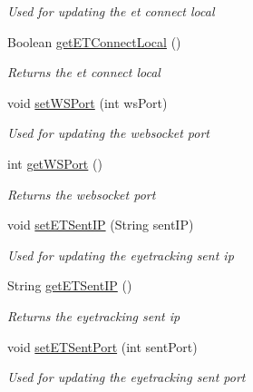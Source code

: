 \begin{DoxyCompactItemize}
\begin{DoxyCompactList}\small\item\em Used for updating the et connect local \end{DoxyCompactList}\item 
Boolean \hyperlink{class_web_analyzer_1_1_u_i_1_1_interaction_objects_1_1_application_settings_obj_a42c4eab832591c0046d0d9709742d79d}{get\+E\+T\+Connect\+Local} ()
\begin{DoxyCompactList}\small\item\em Returns the et connect local \end{DoxyCompactList}\item 
void \hyperlink{class_web_analyzer_1_1_u_i_1_1_interaction_objects_1_1_application_settings_obj_a5da6f244c6f2a35fa197070eecf8cd29}{set\+W\+S\+Port} (int ws\+Port)
\begin{DoxyCompactList}\small\item\em Used for updating the websocket port \end{DoxyCompactList}\item 
int \hyperlink{class_web_analyzer_1_1_u_i_1_1_interaction_objects_1_1_application_settings_obj_a2a7a4913d53f8a212ac7ddcaaa28e9ad}{get\+W\+S\+Port} ()
\begin{DoxyCompactList}\small\item\em Returns the websocket port \end{DoxyCompactList}\item 
void \hyperlink{class_web_analyzer_1_1_u_i_1_1_interaction_objects_1_1_application_settings_obj_a57791b867b39f8081b0db8bfc151269b}{set\+E\+T\+Sent\+I\+P} (String sent\+I\+P)
\begin{DoxyCompactList}\small\item\em Used for updating the eyetracking sent ip \end{DoxyCompactList}\item 
String \hyperlink{class_web_analyzer_1_1_u_i_1_1_interaction_objects_1_1_application_settings_obj_a9068e7afcd99a469070610a473e92937}{get\+E\+T\+Sent\+I\+P} ()
\begin{DoxyCompactList}\small\item\em Returns the eyetracking sent ip \end{DoxyCompactList}\item 
void \hyperlink{class_web_analyzer_1_1_u_i_1_1_interaction_objects_1_1_application_settings_obj_a095d468164bf3a15afb20263d5c4acc9}{set\+E\+T\+Sent\+Port} (int sent\+Port)
\begin{DoxyCompactList}\small\item\em Used for updating the eyetracking sent port \end{DoxyCompactList}\item 

\end{DoxyCompactItemize}
